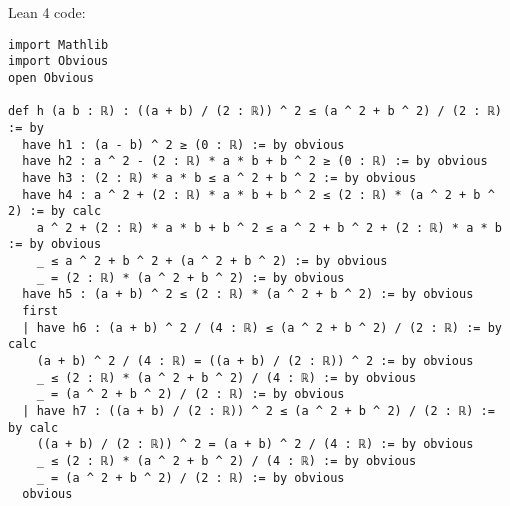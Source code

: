 \documentclass{article}
\begin{document}
Lean 4 code:
\begin{tcolorbox}[colback=white!10, width=\linewidth]
\begin{lstlisting}[language=Lean4]
import Mathlib
import Obvious
open Obvious

def h (a b : ℝ) : ((a + b) / (2 : ℝ)) ^ 2 ≤ (a ^ 2 + b ^ 2) / (2 : ℝ) := by
  have h1 : (a - b) ^ 2 ≥ (0 : ℝ) := by obvious
  have h2 : a ^ 2 - (2 : ℝ) * a * b + b ^ 2 ≥ (0 : ℝ) := by obvious
  have h3 : (2 : ℝ) * a * b ≤ a ^ 2 + b ^ 2 := by obvious
  have h4 : a ^ 2 + (2 : ℝ) * a * b + b ^ 2 ≤ (2 : ℝ) * (a ^ 2 + b ^ 2) := by calc
    a ^ 2 + (2 : ℝ) * a * b + b ^ 2 ≤ a ^ 2 + b ^ 2 + (2 : ℝ) * a * b := by obvious
    _ ≤ a ^ 2 + b ^ 2 + (a ^ 2 + b ^ 2) := by obvious
    _ = (2 : ℝ) * (a ^ 2 + b ^ 2) := by obvious
  have h5 : (a + b) ^ 2 ≤ (2 : ℝ) * (a ^ 2 + b ^ 2) := by obvious
  first
  | have h6 : (a + b) ^ 2 / (4 : ℝ) ≤ (a ^ 2 + b ^ 2) / (2 : ℝ) := by calc
    (a + b) ^ 2 / (4 : ℝ) = ((a + b) / (2 : ℝ)) ^ 2 := by obvious
    _ ≤ (2 : ℝ) * (a ^ 2 + b ^ 2) / (4 : ℝ) := by obvious
    _ = (a ^ 2 + b ^ 2) / (2 : ℝ) := by obvious
  | have h7 : ((a + b) / (2 : ℝ)) ^ 2 ≤ (a ^ 2 + b ^ 2) / (2 : ℝ) := by calc
    ((a + b) / (2 : ℝ)) ^ 2 = (a + b) ^ 2 / (4 : ℝ) := by obvious
    _ ≤ (2 : ℝ) * (a ^ 2 + b ^ 2) / (4 : ℝ) := by obvious
    _ = (a ^ 2 + b ^ 2) / (2 : ℝ) := by obvious
  obvious

\end{lstlisting}
\end{tcolorbox}
\end{document}
